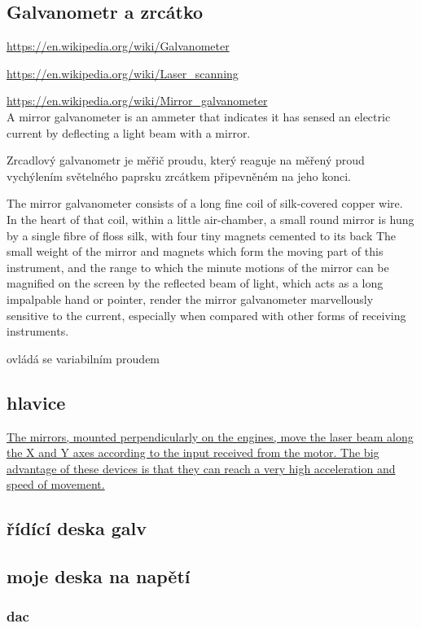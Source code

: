 \documentclass{template/socthesis}
\begin{document}
\subsection{Galvanometr a zrcátko}
\url{https://en.wikipedia.org/wiki/Galvanometer}

\url{https://en.wikipedia.org/wiki/Laser_scanning}

\url{https://en.wikipedia.org/wiki/Mirror_galvanometer} \\

A mirror galvanometer is an ammeter that indicates it has sensed an electric current by deflecting a light beam with a mirror.

Zrcadlový galvanometr je měřič proudu, který reaguje na měřený proud vychýlením světelného paprsku zrcátkem připevněném na jeho konci.\cite{zrcadlovy-galvanometr-wiki}

The mirror galvanometer consists of a long fine coil of silk-covered copper wire. In the heart of that coil, within a little air-chamber, a small round mirror is hung by a single fibre of floss silk, with four tiny magnets cemented to its back
The small weight of the mirror and magnets which form the moving part of this instrument, and the range to which the minute motions of the mirror can be magnified on the screen by the reflected beam of light, which acts as a long impalpable hand or pointer, render the mirror galvanometer marvellously sensitive to the current, especially when compared with other forms of receiving instruments.

ovládá se variabilním proudem

\subsection{hlavice}
\href{https://elenlaser.com/blog/galvo-head-laser-focus-tool.html}{The mirrors, mounted perpendicularly on the engines, move the laser beam along the X and Y axes according to the input received from the motor.
The big advantage of these devices is that they can reach a very high acceleration and speed of movement.}
\subsection{řídící deska galv}
\subsection{moje deska na napětí}
\subsubsection{dac}
\end{document}
